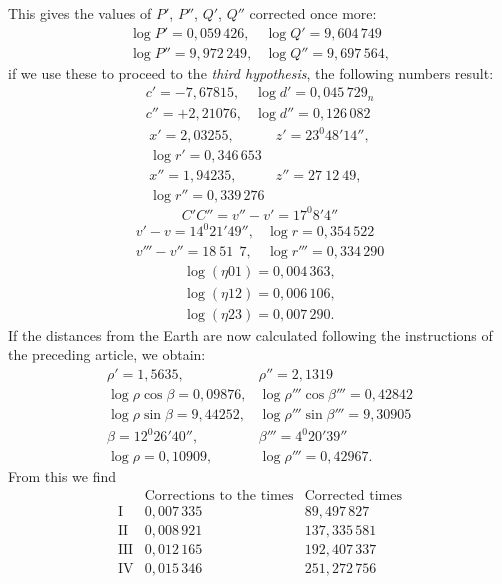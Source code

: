 This gives the values of $P'$, $P''$, $Q'$, $Q''$ corrected once more:
\[
\begin{array}{ll}
\log P' = 0{,}059\,426, & \log Q' = 9{,}604\,749 \\
\log P'' = 9{,}972\,249, & \log Q'' = 9{,}697\,564,
\end{array}
\]
if we use these to proceed to the \emph{third hypothesis}, the following numbers
result:
\[
\begin{array}{ll}
c' = -7{,}67815, & \log d' = 0{,}045\,729_n \\
c'' = +2{,}21076, & \log d'' = 0{,}126\,082
\end{array}
\]
\[
\begin{array}{ll}
x' = 2{,}03255, & z' = 23^{0}48'14'',\\
\log r' = 0{,}346\,653 & \\
x'' = 1{,}94235, & z'' = 27\ 12\ 49,\\
\log r'' = 0{,}339\,276 & 
\end{array}
\]
\[
C'C'' = v''-v' = 17^{0}8'4''
\]
\[
\begin{array}{ll}
v'-v = 14^{0}21'49'', & \log r = 0{,}354\,522 \\
v'''-v'' = 18\ 51\ \ 7, & \log r''' = 0{,}334\,290
\end{array}
\]
\[
\begin{gathered}
\log(\eta 01) = 0{,}004\,363, \\ \log(\eta 12) = 0{,}006\,106, \\ \log(\eta 23) = 0{,}007\,290.
\end{gathered}
\]
If the distances from the Earth are now calculated following the instructions of the preceding article,
we obtain:
\[
\begin{array}{ll}
\rho' = 1{,}5635, & \rho'' = 2{,}1319 \\
\log \rho \cos\beta = 0{,}09876, & \log \rho'''\cos\beta''' = 0{,}42842 \\
\log \rho \sin\beta = 9{,}44252, & \log \rho'''\sin\beta''' = 9{,}30905 \\
\beta = 12^{0}26'40'', & \beta''' = 4^{0}20'39'' \\
\log \rho = 0{,}10909, & \log \rho''' = 0{,}42967.
\end{array}
\]
From this we find
\[
\begin{array}{c|c|c}
 & \text{Corrections to the times} & \text{Corrected times} \\
\hline
\text{I} & 0{,}007\,335 & 89{,}497\,827 \\
\text{II} & 0{,}008\,921 & 137{,}335\,581 \\
\text{III} & 0{,}012\,165 & 192{,}407\,337 \\
\text{IV} & 0{,}015\,346 & 251{,}272\,756
\end{array}
\]

